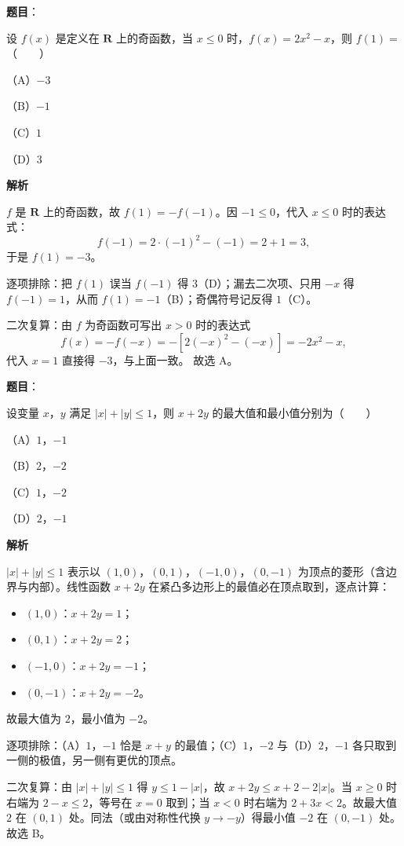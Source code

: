 \begin{answer}

\textbf{题目}：

设 $f(x)$ 是定义在 $\mathbf R$ 上的奇函数，当 $x\leqslant 0$ 时，$f(x)=2x^2-x$，则 $f(1)=$\mbox{（　　）}

（A）$-3$

（B）$-1$

（C）$1$

（D）$3$

\textbf{解析}

$f$ 是 $\mathbf R$ 上的奇函数，故 $f(1)=-f(-1)$。因 $-1\leqslant0$，代入 $x\leqslant0$ 时的表达式：
\nopagebreak[4]
\[f(-1)=2\cdot(-1)^2-(-1)=2+1=3,\]
于是 $f(1)=-3$。

逐项排除：把 $f(1)$ 误当 $f(-1)$ 得 $3$（D）；漏去二次项、只用 $-x$ 得 $f(-1)=1$，从而 $f(1)=-1$（B）；奇偶符号记反得 $1$（C）。

二次复算：由 $f$ 为奇函数可写出 $x>0$ 时的表达式
\nopagebreak[4]
\[f(x)=-f(-x)=-\left[2(-x)^2-(-x)\right]=-2x^2-x,\]
代入 $x=1$ 直接得 $-3$，与上面一致。
故选 A。


\end{answer}
\begin{answer}

\textbf{题目}：

设变量 $x$，$y$ 满足 $|x|+|y|\leqslant 1$，则 $x+2y$ 的最大值和最小值分别为\mbox{（　　）}

（A）$1$，$-1$

（B）$2$，$-2$

（C）$1$，$-2$

（D）$2$，$-1$

\textbf{解析}

$|x|+|y|\leqslant1$ 表示以 $(1,0)$，$(0,1)$，$(-1,0)$，$(0,-1)$ 为顶点的菱形（含边界与内部）。线性函数 $x+2y$ 在紧凸多边形上的最值必在顶点取到，逐点计算：

\begin{itemize}
\item $(1,0)$：$x+2y=1$；
\item $(0,1)$：$x+2y=2$；
\item $(-1,0)$：$x+2y=-1$；
\item $(0,-1)$：$x+2y=-2$。
\end{itemize}

故最大值为 $2$，最小值为 $-2$。

逐项排除：（A）$1$，$-1$ 恰是 $x+y$ 的最值；（C）$1$，$-2$ 与（D）$2$，$-1$ 各只取到一侧的极值，另一侧有更优的顶点。

二次复算：由 $|x|+|y|\leqslant1$ 得 $y\leqslant1-|x|$，故 $x+2y\leqslant x+2-2|x|$。当 $x\geqslant0$ 时右端为 $2-x\leqslant2$，等号在 $x=0$ 取到；当 $x<0$ 时右端为 $2+3x<2$。故最大值 $2$ 在 $(0,1)$ 处。同法（或由对称性代换 $y\to-y$）得最小值 $-2$ 在 $(0,-1)$ 处。
故选 B。


\end{answer}

